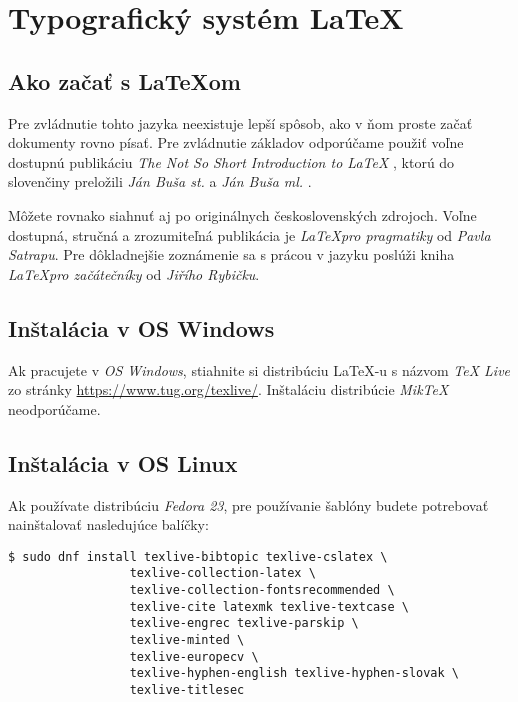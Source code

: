 \chapter{Typografický systém \LaTeX}
\label{ch:instalacia}

\section{Ako začať s \LaTeX{}om}

Pre zvládnutie tohto jazyka neexistuje lepší spôsob, ako v ňom proste začať dokumenty rovno písať. Pre zvládnutie základov odporúčame použiť voľne dostupnú publikáciu \emph{The Not So Short Introduction to \LaTeX} \cite{lshort}, ktorú do slovenčiny preložili \emph{Ján Buša st.} a \emph{Ján Buša ml.} \cite{lshortsk}.

Môžete rovnako siahnuť aj po originálnych československých zdrojoch. Voľne dostupná, stručná a zrozumiteľná publikácia je \emph{\LaTeX pro pragmatiky} \cite{satrapa2011} od \emph{Pavla Satrapu}. Pre dôkladnejšie zoznámenie sa s prácou v jazyku poslúži kniha \emph{\LaTeX pro začátečníky} \cite{rybicka2003} od \emph{Jiřího Rybičku}. 


\section{Inštalácia v OS Windows}

Ak pracujete v \emph{OS Windows}, stiahnite si distribúciu \LaTeX-u s názvom \emph{TeX Live} zo stránky \url{https://www.tug.org/texlive/}. Inštaláciu distribúcie \emph{MikTeX} neodporúčame.


\section{Inštalácia v OS Linux}

Ak používate distribúciu \emph{Fedora 23}, pre používanie šablóny budete potrebovať nainštalovať nasledujúce balíčky:

\begin{verbatim}
$ sudo dnf install texlive-bibtopic texlive-cslatex \
                 texlive-collection-latex \
                 texlive-collection-fontsrecommended \
                 texlive-cite latexmk texlive-textcase \
                 texlive-engrec texlive-parskip \
                 texlive-minted \
                 texlive-europecv \
                 texlive-hyphen-english texlive-hyphen-slovak \
                 texlive-titlesec
\end{verbatim}

